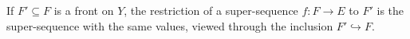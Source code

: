 \begin{definition}
If $F'\subseteq F$ is a front on $Y$, the restriction of a super-sequence
$f:F\to E$ to $F'$ is the super-sequence with the same values, viewed
through the inclusion $F'\hookrightarrow F$.
\end{definition}

